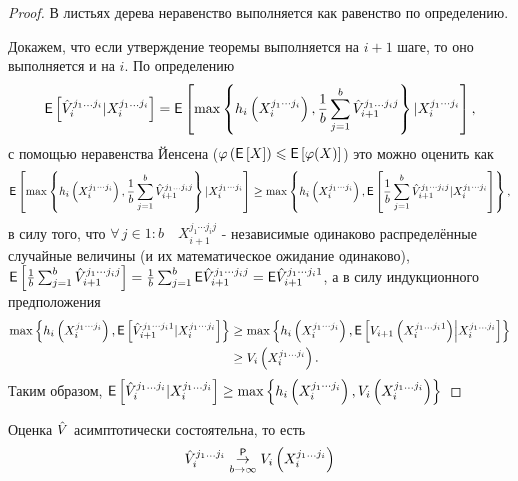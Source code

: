 	\begin{proof}
		\par В листьях дерева неравенство выполняется как равенство по определению.
		\par Докажем, что если утверждение теоремы выполняется на $i+1$ шаге, то оно выполняется и на $i$. По определению
		\begin{equation*}
		\mathsf{E}\left[\hat{V}_i^{j_1\ldots j_i}|X_i^{j_1\ldots j_i}\right] = \mathsf{E}\left[ \max\left\lbrace h_i\left(X_i^{j_1\cdots j_i}\right), \frac{1}{b}\sum_{j = 1}^b \hat{V}_{i+1}^{j_1 \ldots j_i j}\right\rbrace | X_i^{j_1\cdots j_i} \right],
		\end{equation*}
		с помощью неравенства Йенсена ($\varphi\left(\mathsf{E}\left[X\right]\right) \leqslant \mathsf{E}\left[\varphi(X)\right]$) это можно оценить как
		\begin{equation*}
		\mathsf{E}\left[ \max\left\lbrace h_i\left(X_i^{j_1\cdots j_i}\right), \frac{1}{b}\sum_{j = 1}^b \hat{V}_{i+1}^{j_1 \ldots j_i j}\right\rbrace | X_i^{j_1\cdots j_i} \right] \geq \max\left\lbrace h_i\left(X_i^{j_1\cdots j_i}\right), \mathsf{E}\left[ \frac{1}{b}\sum_{j = 1}^b \hat{V}_{i+1}^{j_1 \cdots j_i j} | X_i^{j_1\cdots j_i} \right] \right\rbrace,
		\end{equation*}
		в силу того, что $\forall \, j \in 1:b \quad X_{i+1}^{j_1\cdots j_i j}$ - независимые одинаково распределённые случайные величины (и их математическое ожидание одинаково), $\mathsf{E}\left[ \frac{1}{b}\sum_{j = 1}^b \hat{V}_{i+1}^{j_1 \cdots j_i j} \right] = \frac{1}{b}\sum_{j = 1}^b \mathsf{E}\hat{V}_{i+1}^{j_1 \cdots j_i j} = \mathsf{E}\hat{V}_{i+1}^{j_1 \cdots j_i 1}$, а в силу индукционного предположения
		\begin{equation*}
		\begin{aligned}
		\max\left\lbrace 
			h_i\left(X_i^{j_1\cdots j_i}\right), 
			\mathsf{E}\left[ \hat{V}_{i+1}^{j_1 \cdots j_i 1} | X_i^{j_1\cdots j_i} \right] 
		\right\rbrace &\geq \max \left\lbrace 
			h_i\left(X_i^{j_1\cdots j_i}\right),
			\mathsf{E}\left[V_{i+1}\left(X_i^{j_1\ldots j_i 1}\right)\middle\vert X_i^{j_1\ldots j_i}\right]
		\right\rbrace \\ &\geq V_i\left(X_i^{j_1\ldots j_i}\right).
		\end{aligned}
		\end{equation*}
		Таким образом, $\mathsf{E}\left[\hat{V}_i^{j_1\ldots j_i}|X_i^{j_1\ldots j_i}\right] \geq \max \left\lbrace h_i\left(X_i^{j_1\cdots j_i}\right), V_i\left(X_i^{j_1\ldots j_i}\right) \right\rbrace$
	\end{proof}
	\begin{theorem} Оценка $\hat{V}$ асимптотически состоятельна, то есть
		$$\hat{V}_i^{j_1\ldots j_i} \underset{b\to\infty}{\overset{\mathsf{P}}{\to}} V_i\left(X_i^{j_1\ldots j_i}\right)$$
	\end{theorem}
